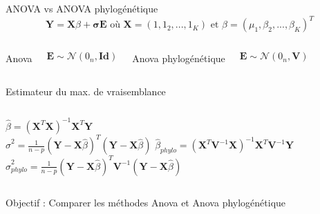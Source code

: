 \documentclass[10pt]{beamer}\usepackage[]{graphicx}\usepackage[]{xcolor}
\begin{document}
\begin{frame}{ANOVA vs ANOVA phylogénétique}
  \begin{equation*}
    \bm{Y} = \bm{X}\beta+ \bm{\sigma} \bm{E}  \text{  où  } \bm{X}=(1,1_2, ..., 1_K) \text{   et   }\beta = (\mu _1, \beta _2, ..., \beta _K)^T
  \end{equation*}
    \begin{columns}

       \begin{center}
       Anova
       \end{center}
    \begin{equation*}
    \bm{E} \sim \mathcal{N}(0_n, \bm{Id})
      \end{equation*} 
      
    \begin{center}
       Anova phylogénétique 
       \end{center}
    \begin{equation*}
    \bm{E} \sim \mathcal{N}(0_n, \bm{V})
    \end{equation*}
  \end{columns}
    \begin{center}
        Estimateur du max. de vraisemblance
    \end{center}
  \begin{columns}
      \centering
        $\hat{\beta} = (\bm{X}^{T}\bm{X})^{-1}\bm{X}^{T}\bm{Y}$\\
        $\hat{\sigma}^2 =  \frac{1}{n-p} (\bm{Y} - \bm{X}\hat{\beta})^T(\bm{Y} - \bm{X}\hat{\beta})$
      \centering
        $\hat{\beta}_{phylo} = (\bm{X}^{T}\bm{V}^{-1}\bm{X})^{-1}\bm{X}^{T}\bm{V}^{-1}\bm{Y}$\\
        $\hat{\sigma}_{phylo}^2 =  \frac{1}{n-p} (\bm{Y} - \bm{X}\hat{\beta})^T\bm{V}^{-1}(\bm{Y} - \bm{X}\hat{\beta})$
  \end{columns}
  

Objectif : Comparer les méthodes Anova et Anova phylogénétique
\end{frame}
\end{document}
